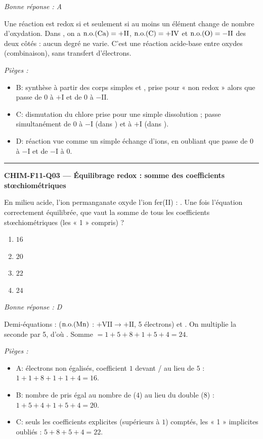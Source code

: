 \documentclass[11pt,a4paper]{article}
\begin{document}
\textit{Bonne réponse : A}\par
Une réaction est redox si et seulement si au moins un élément change de nombre d'oxydation. Dans , on a $\mathrm{n.o.}(\ce{Ca})=+\mathrm{II}$, $\mathrm{n.o.}(\ce{C})=+\mathrm{IV}$ et $\mathrm{n.o.}(\ce{O})=-\mathrm{II}$ des deux côtés : aucun degré ne varie. C'est une réaction acide-base entre oxydes (combinaison), sans transfert d'électrons.\par
\textit{Pièges :}
\begin{itemize}
\item B: synthèse à partir des corps simples  et , prise pour « non redox » alors que  passe de $0$ à $+\mathrm{I}$ et  de $0$ à $-\mathrm{II}$.
\item C: dismutation du chlore prise pour une simple dissolution ;  passe simultanément de $0$ à $-\mathrm{I}$ (dans ) et à $+\mathrm{I}$ (dans ).
\item D: réaction vue comme un simple échange d'ions, en oubliant que  passe de $0$ à $-\mathrm{I}$ et  de $-\mathrm{I}$ à $0$.
\end{itemize}
\vspace{8pt}\hrule\vspace{8pt}
\noindent\textbf{CHIM-F11-Q03 --- Équilibrage redox : somme des coefficients stœchiométriques}\par
En milieu acide, l'ion permanganate oxyde l'ion fer(II) : . Une fois l'équation correctement équilibrée, que vaut la somme de tous les coefficients stœchiométriques (les « 1 » compris) ?
\begin{enumerate}[label=\Alph*)]
\item $16$
\item $20$
\item $22$
\item $24$
\end{enumerate}
\textit{Bonne réponse : D}\par
Demi-équations :  ($\mathrm{n.o.}(\ce{Mn})$ : $+\mathrm{VII}\to+\mathrm{II}$, 5 électrons) et . On multiplie la seconde par 5, d'où . Somme $=1+5+8+1+5+4=24$.\par
\textit{Pièges :}
\begin{itemize}
\item A: électrons non égalisés, coefficient $1$ devant / au lieu de $5$ : $1+1+8+1+1+4=16$.
\item B: nombre de  pris égal au nombre de  ($4$) au lieu du double ($8$) : $1+5+4+1+5+4=20$.
\item C: seuls les coefficients explicites (supérieurs à $1$) comptés, les « 1 » implicites oubliés : $5+8+5+4=22$.
\end{itemize}
\end{document}
